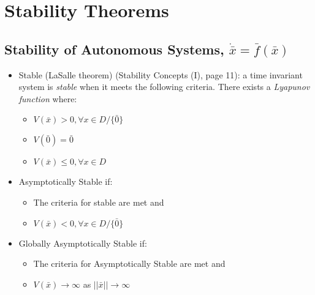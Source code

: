 \documentclass[12pt]{article}
\begin{document}
\newpage
\section*{Stability Theorems}
\subsection*{Stability of Autonomous Systems, $\dot{\bar{x}}=\bar{f}(\bar{x})$}
\begin{itemize}
\item Stable (LaSalle theorem) (Stability Concepts (I), page 11): a time invariant system is {\em stable} when it meets the following criteria. There exists a {\em Lyapunov function} where:
	\begin{itemize}
	\item $V(\bar{x})>0, \forall x \in D/\{\bar{0}\}$
	\item $V(\bar{0})=\bar{0}$
	\item $V(\bar{x})\leq0, \forall x \in D$
	\end{itemize}
\item Asymptotically Stable if:
	\begin{itemize}
	\item The criteria for stable are met and
	\item $V(\bar{x})<0, \forall x \in D/\{\bar{0}\}$
	\end{itemize}
\item Globally Asymptotically Stable if:
	\begin{itemize}
	\item The criteria for Asymptotically Stable are met and
	\item $V(\bar{x})\to\infty$ as $||\bar{x}||\to\infty$
	\end{itemize}
\end{itemize}

\newpage
\end{document}
